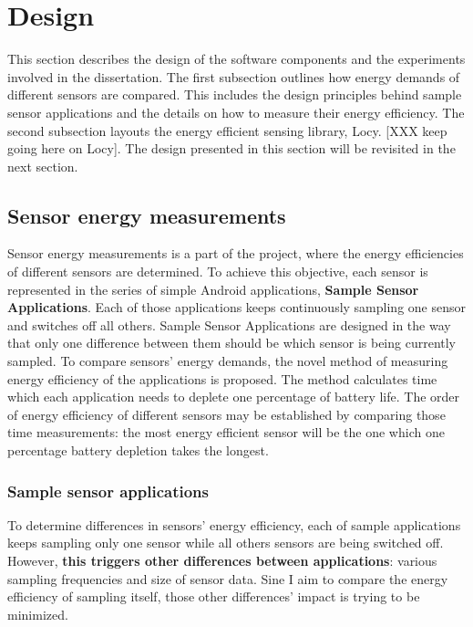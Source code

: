 \section{Design}
\label{s:design}
\hspace{10pt} This section describes the design of the software components and the experiments involved in the dissertation. The first subsection outlines how energy demands of different sensors are compared. This includes the design principles behind sample sensor applications and the details on how to measure their energy efficiency. The second subsection layouts the energy efficient sensing library, Locy. [XXX keep going here on Locy]. The design presented in this section will be revisited in the next section.

\subsection{Sensor energy measurements}
\label{s:design:measurements}
\hspace{10pt} Sensor energy measurements is a part of the project, where the energy efficiencies of different sensors are determined. To achieve this objective, each sensor is represented in the series of simple Android applications, \textbf{Sample Sensor Applications}. Each of those applications keeps continuously sampling one sensor and switches off all others. Sample Sensor Applications are designed in the way that only one difference between them should be which sensor is being currently sampled. To compare sensors' energy demands, the novel method of measuring energy efficiency of the applications is proposed. The method calculates time which each application needs to deplete one percentage of battery life. The order of energy efficiency of different sensors may be established by comparing those time measurements: the most energy efficient sensor will be the one which one percentage battery depletion takes the longest. 

\subsubsection{Sample sensor applications}
\label{s:design:measurements:sampleapps}
\hspace{10pt} To determine differences in sensors' energy efficiency, each of sample applications keeps sampling only one sensor while all others sensors are being switched off.  However, \textbf{this triggers other differences between applications}: various sampling frequencies and size of sensor data. Sine I aim to compare the energy efficiency of sampling itself, those other differences' impact is trying to be minimized. 

